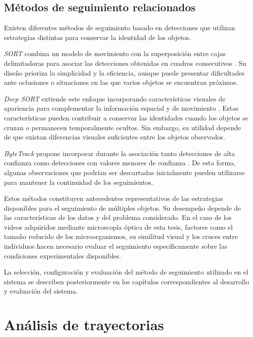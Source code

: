 \subsection{Métodos de seguimiento relacionados}

Existen diferentes métodos de seguimiento basado en detecciones que utilizan estrategias distintas para conservar la identidad de los objetos.

\textit{SORT} combina un modelo de movimiento con la superposición entre cajas delimitadoras para asociar las detecciones obtenidas en cuadros consecutivos \cite{bewley2016}. Su diseño prioriza la simplicidad y la eficiencia, aunque puede presentar dificultades ante oclusiones o situaciones en las que varios objetos se encuentran próximos.

\textit{Deep SORT} extiende este enfoque incorporando características visuales de apariencia para complementar la información espacial y de movimiento \cite{wojke2017}. Estas características pueden contribuir a conservar las identidades cuando los objetos se cruzan o permanecen temporalmente ocultos. Sin embargo, su utilidad depende de que existan diferencias visuales suficientes entre los objetos observados.

\textit{ByteTrack} propone incorporar durante la asociación tanto detecciones de alta confianza como detecciones con valores menores de confianza \cite{zhang2022}. De esta forma, algunas observaciones que podrían ser descartadas inicialmente pueden utilizarse para mantener la continuidad de los seguimientos.

Estos métodos constituyen antecedentes representativos de las estrategias disponibles para el seguimiento de múltiples objetos. Su desempeño depende de las características de los datos y del problema considerado. En el caso de los videos adquiridos mediante microscopía óptica de esta tesis, factores como el tamaño reducido de los microorganismos, su similitud visual y los cruces entre individuos hacen necesario evaluar el seguimiento específicamente sobre las condiciones experimentales disponibles.

La selección, configuración y evaluación del método de seguimiento utilizado en el sistema se describen posteriormente en los capítulos correspondientes al desarrollo y evaluación del sistema.

\section{Análisis de trayectorias}

